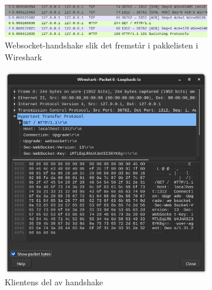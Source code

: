 \documentclass{article}
\begin{document}
\begin{figure}[ht]
    \centering
    \begin{subfigure}{\linewidth}
        \centering
        \includegraphics*[width=\linewidth]{illustrasjoner/WS_handshake.png}
        \caption{Websocket-handshake slik det fremstår i pakkelisten i Wireshark}
    \end{subfigure}

    \begin{subfigure}{.48\linewidth}
        \centering
        \includegraphics*[width=\linewidth]{illustrasjoner/WS_handshake_klient.png}
        \caption{Klientens del av handshake}
    \end{subfigure}
    \hfill
    \begin{subfigure}{.48\linewidth}
        \centering

\end{subfigure}
\end{figure}
\end{document}
